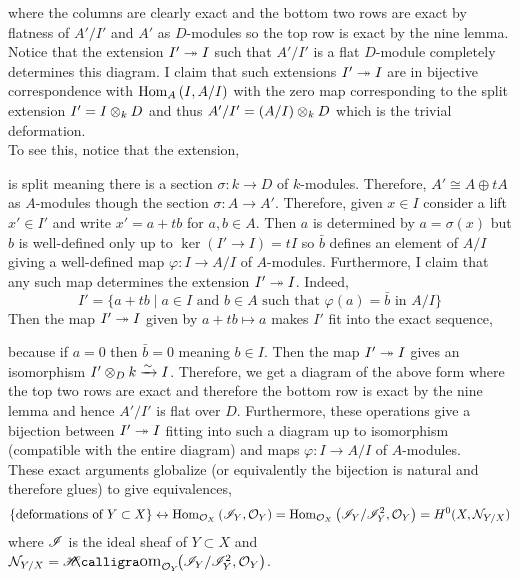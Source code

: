 \documentclass[12pt]{article}
\begin{document}
where the columns are clearly exact and the bottom two rows are exact by flatness of $A'/I'$ and $A'$ as $D$-modules so the top row is exact by the nine lemma. Notice that the extension $I' \twoheadrightarrow I$ such that $A' / I'$ is a flat $D$-module completely determines this diagram. I claim that such extensions $I' \twoheadrightarrow I$ are in bijective correspondence with $\mathrm{Hom}_{A} \left( I, A/I \right)$ with the zero map corresponding to the split extension $I' = I \otimes_k D$ and thus $A' / I' = (A/I) \otimes_k D$ which is the trivial deformation. 
\bigskip\\
To see this, notice that the extension,
\begin{center}
\end{center}
is split meaning there is a section $\sigma : k \to D$ of $k$-modules. Therefore, $A' \cong A \oplus t A$ as $A$-modules though the section $\sigma : A \to A'$. Therefore, given $x \in I$ consider a lift $x' \in I'$ and write $x' = a + t b$ for $a,b \in A$. Then $a$ is determined by $a = \sigma(x)$ but $b$ is well-defined only up to $\ker{(I' \to I)} = t I$ so $\bar{b}$ defines an element of $A / I$ giving a well-defined map $\varphi : I \to A/I$ of $A$-modules. Furthermore, I claim that any such map determines the extension $I' \twoheadrightarrow I$. Indeed, 
\[ I' = \{ a + t b \mid a \in I \text{ and } b \in A \text{ such that } \varphi(a) = \bar{b} \text{ in } A / I \} \]
Then the map $I' \twoheadrightarrow I$ given by $a + t b \mapsto a$ makes $I'$ fit into the exact sequence,
\begin{center}
\end{center}
because if $a = 0$ then $\bar{b} = 0$ meaning $b \in I$. Then the map $I' \twoheadrightarrow I$ gives an isomorphism $I' \otimes_D k \xrightarrow{\sim} I$. Therefore, we get a diagram of the above form where the top two rows are exact and therefore the bottom row is exact by the nine lemma and hence $A'/I'$ is flat over $D$. Furthermore, these operations give a bijection between $I' \twoheadrightarrow I$ fitting into such a diagram up to isomorphism (compatible with the entire diagram) and maps $\varphi : I \to A / I$ of $A$-modules.
\bigskip\\
These exact arguments globalize (or equivalently the bijection is natural and therefore glues) to give equivalences,
\[ \{ \text{deformations of } Y \subset X \} \leftrightarrow \mathrm{Hom}_{\mathcal{O}_{X}} \left( \mathscr{I}_Y, \mathcal{O}_{Y} \right) = \mathrm{Hom}_{\mathcal{O}_{X}} \left( \mathscr{I}_Y / \mathscr{I}_Y^2, \mathcal{O}_{Y} \right) = H^0(X, \mathcal{N}_{Y/X}) \]
where $\mathscr{I}$ is the ideal sheaf of $Y \subset X$ and $\sN_{Y/X} = \shHom{\struct{Y}}{\I_Y/\I_Y^2}{\struct{Y}}$.
\end{document}

